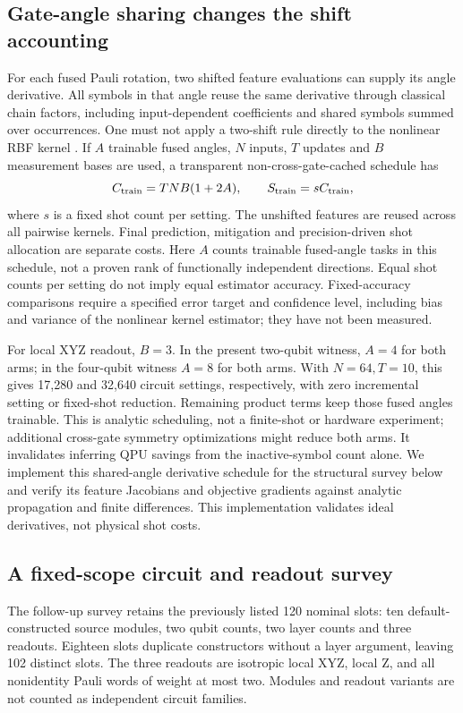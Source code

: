 \subsection{Gate-angle sharing changes the shift accounting}
For each fused Pauli rotation, two shifted feature evaluations can
supply its angle derivative. All symbols in that angle reuse the same
derivative through classical chain factors, including input-dependent
coefficients and shared symbols summed over occurrences. One must not
apply a two-shift rule directly to the nonlinear RBF kernel
\cite{schuldgradients}. If $A$ trainable fused angles, $N$ inputs,
$T$ updates and $B$ measurement bases are used, a transparent
non-cross-gate-cached schedule has
\begin{equation}
 C_{\rm train}=TNB(1+2A),\qquad
 S_{\rm train}=s C_{\rm train},
\end{equation}
where $s$ is a fixed shot count per setting. The unshifted features are
reused across all pairwise kernels. Final prediction, mitigation and
precision-driven shot allocation are separate costs. Here $A$ counts
trainable fused-angle tasks in this schedule, not a proven rank of
functionally independent directions. Equal shot counts per setting do
not imply equal estimator accuracy. Fixed-accuracy comparisons require
a specified error target and confidence level, including bias and
variance of the nonlinear kernel estimator; they have not been measured.

For local XYZ readout, $B=3$. In the present two-qubit witness,
$A=4$ for both arms; in the four-qubit witness $A=8$ for both arms.
With $N=64,T=10$, this gives 17,280 and 32,640 circuit settings,
respectively, with zero incremental setting or fixed-shot reduction.
Remaining product terms keep those fused angles trainable.
This is analytic scheduling, not a finite-shot or hardware experiment;
additional cross-gate symmetry optimizations might reduce both arms.
It invalidates inferring QPU savings from the inactive-symbol count
alone. We implement this shared-angle derivative schedule for the
structural survey below and verify its feature Jacobians and objective
gradients against analytic propagation and finite differences. This
implementation validates ideal derivatives, not physical shot costs.

\subsection{A fixed-scope circuit and readout survey}
The follow-up survey retains the previously listed 120 nominal slots:
ten default-constructed source modules, two qubit counts, two layer
counts and three readouts. Eighteen slots duplicate constructors
without a layer argument, leaving 102 distinct slots. The three
readouts are isotropic local XYZ, local Z, and all nonidentity Pauli
words of weight at most two. Modules and readout variants are not
counted as independent circuit families.

